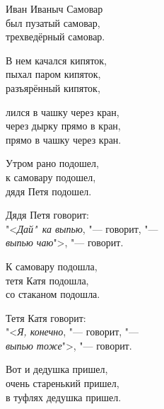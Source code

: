 {\centering

    \parbox{6cm}{Иван Иваныч Самовар \\
    был пузатый самовар, \\
    трехведёрный самовар.}

    \vspace{0.5cm}

    \hspace{1cm}
    \parbox{6cm}{В нем качался кипяток, \\
    пыхал паром кипяток, \\
    разъярённый кипяток,}

    \vspace{0.5cm}

    \parbox{6cm}{лился в чашку через кран, \\
    через дырку прямо в кран, \\
    прямо в чашку через кран. }

    \vspace{0.5cm}

    \hspace{1cm}
    \parbox{6cm}{Утром рано подошел, \\
    к самовару подошел, \\
    дядя Петя подошел. }

    \vspace{0.5cm}

    \parbox{6cm}{Дядя Петя говорит: \\
    "<\textit{Дай"~ка выпью}, "--- говорит, "--- \\
    \textit{выпью чаю}">, "--- говорит. }

    \vspace{0.5cm}

    \hspace{1cm}
    \parbox{6cm}{К самовару подошла, \\
    тетя Катя подошла, \\
    со стаканом подошла. }

    \vspace{0.5cm}

    \parbox{6cm}{Тетя Катя говорит: \\
    "<\textit{Я, конечно}, "--- говорит, "--- \\
    \textit{выпью тоже}">, "--- говорит. }

    \vspace{0.5cm}

    \hspace{1cm}
    \parbox{6cm}{Вот и дедушка пришел, \\
    очень старенький пришел, \\
    в туфлях дедушка пришел. }

}
